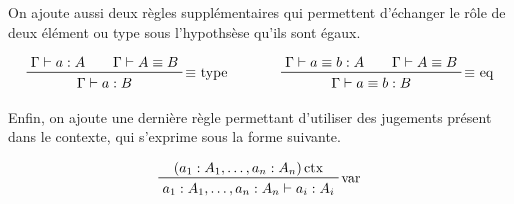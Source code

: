 \documentclass[../../rapport.tex]{subfiles}
\begin{document}
  On ajoute aussi deux règles supplémentaires qui permettent d'échanger le rôle de deux élément ou type sous l'hypothsèse qu'ils sont égaux.

  $$
  \prfinterspace=2em
  \begin{array}{cc}
    \prftree[r]{$\equiv$ type}{\Gamma \vdash a : A}{\Gamma \vdash A \equiv B}{\Gamma \vdash a : B} \hspace{1cm}
    & \prftree[r]{$\equiv$ eq}{\Gamma \vdash a \equiv b : A}{\Gamma \vdash A \equiv B}{\Gamma \vdash a \equiv b : B}
  \end{array}
  $$

  Enfin, on ajoute une dernière règle permettant d'utiliser des jugements présent dans le contexte, qui s'exprime sous la forme suivante.

  $$
  \prftree[r]{var}
    {(a_1 : A_1, \hdots, a_n : A_n) \ctx}
    {a_1 : A_1, \hdots, a_n : A_n \vdash a_i : A_i}
  $$
\end{document}
